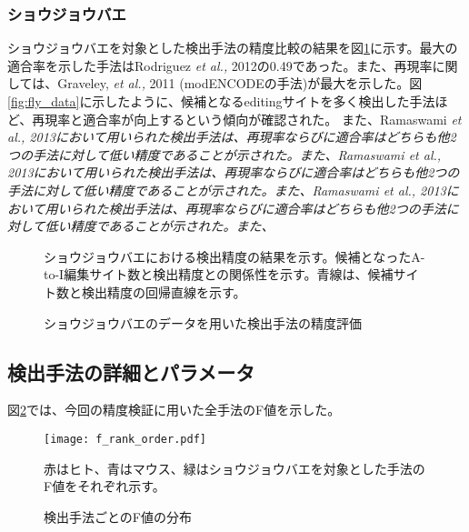 \subsubsection{ショウジョウバエ}
ショウジョウバエを対象とした検出手法の精度比較の結果を図\ref{fig:dmel}に示す。最大の適合率を示した手法はRodriguez \textit{et al., }2012の0.49であった。また、再現率に関しては、Graveley, \textit{et al., }2011 (modENCODEの手法)が最大を示した。図\ref{fig:fly_data}に示したように、候補となるeditingサイトを多く検出した手法ほど、再現率と適合率が向上するという傾向が確認された。
また、Ramaswami \it{et al}\rm{}., 2013において用いられた検出手法は、再現率ならびに適合率はどちらも他2つの手法に対して低い精度であることが示された。また、Ramaswami \it{et al}\rm{}., 2013において用いられた検出手法は、再現率ならびに適合率はどちらも他2つの手法に対して低い精度であることが示された。また、Ramaswami \it{et al}\rm{}., 2013において用いられた検出手法は、再現率ならびに適合率はどちらも他2つの手法に対して低い精度であることが示された。また、
\begin{figure}[!h]
	\begin{center}
		\vspace*{4mm}
		\caption{ショウジョウバエのデータを用いた検出手法の精度評価}
		\label{fig:dmel}
	\end{center}
	\vspace*{-7mm}
	\begin{flushleft}
		\small{\textbf{}ショウジョウバエにおける検出精度の結果を示す。\textbf{}候補となったA-to-I編集サイト数と検出精度との関係性を示す。青線は、候補サイト数と検出精度の回帰直線を示す。}
	\end{flushleft}
\end{figure}

\subsection{検出手法の詳細とパラメータ}
図\ref{fig:f_measure}では、今回の精度検証に用いた全手法のF値を示した。

\begin{figure}[!h]
	\begin{center}
		\texttt{[image: f\_rank\_order.pdf]}
	\end{center}
	\caption{検出手法ごとのF値の分布}
	\begin{flushleft}
		\small{赤はヒト、青はマウス、緑はショウジョウバエを対象とした手法のF値をそれぞれ示す。}
	\end{flushleft}
	\label{fig:f_measure}
\end{figure}

